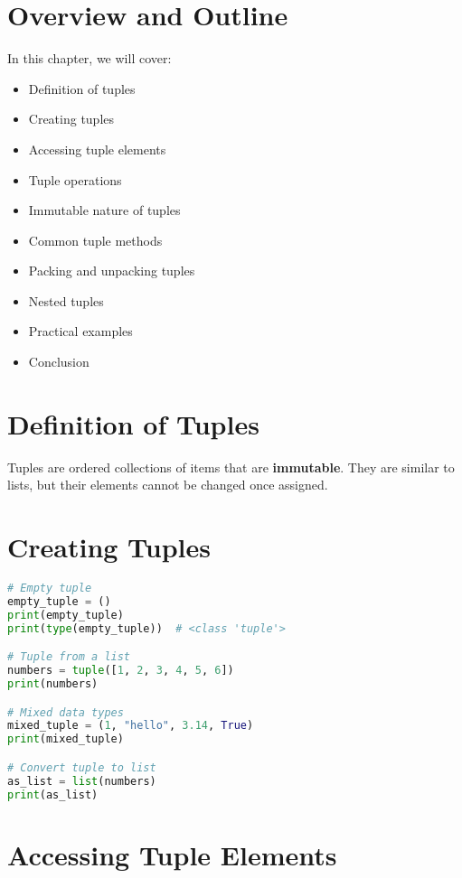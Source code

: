 \section{Overview and Outline}

In this chapter, we will cover:
\begin{itemize}
    \item Definition of tuples
    \item Creating tuples
    \item Accessing tuple elements
    \item Tuple operations
    \item Immutable nature of tuples
    \item Common tuple methods
    \item Packing and unpacking tuples
    \item Nested tuples
    \item Practical examples
    \item Conclusion
\end{itemize}

\section{Definition of Tuples}

Tuples are ordered collections of items that are \textbf{immutable}.  
They are similar to lists, but their elements cannot be changed once assigned.

\section{Creating Tuples}

\begin{lstlisting}[language=Python]
# Empty tuple
empty_tuple = ()
print(empty_tuple)
print(type(empty_tuple))  # <class 'tuple'>

# Tuple from a list
numbers = tuple([1, 2, 3, 4, 5, 6])
print(numbers)

# Mixed data types
mixed_tuple = (1, "hello", 3.14, True)
print(mixed_tuple)

# Convert tuple to list
as_list = list(numbers)
print(as_list)
\end{lstlisting}

\section{Accessing Tuple Elements}


